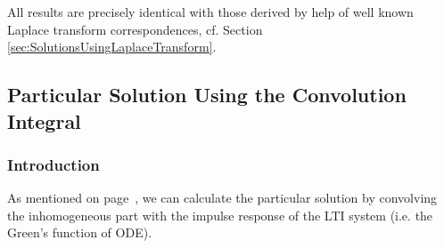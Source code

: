 \documentclass[11pt,a4paper,DIV=12]{scrartcl}
\begin{document}
All results are precisely identical with those derived by help of well known Laplace transform correspondences,
cf. Section \ref{sec:SolutionsUsingLaplaceTransform}.
\clearpage
\subsection{Particular Solution Using the Convolution Integral}
\label{sub:ConvSolutions}
\subsubsection{Introduction}
As mentioned on page~\pageref{pg:sig_sys_ex_03AddOn:convolution}, we can calculate
the particular solution by convolving the inhomogeneous part with the impulse
response of the LTI system (i.e. the Green's function of ODE).
\end{document}
